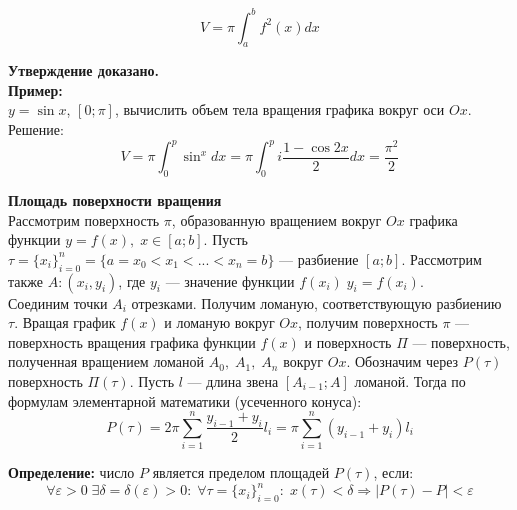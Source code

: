 \documentclass{article}
\begin{document}
  \begin{equation}
    V=\pi\int_a^b f^2(x)dx
  \end{equation}
  
  \textbf{Утверждение доказано.}\\
  
  \textbf{Пример:}\\
  
  $y=\sin x$, $[0;\pi]$, вычислить объем тела вращения графика вокруг оси $Ox$. Решение:\\
  
  \begin{equation}
    V=\pi\int_0^p\sin^x dx=\pi\int_0^pi\frac{1-\cos 2x}{2}dx=\frac{\pi^2}{2}
  \end{equation}
  
  \large\textbf{Площадь поверхности вращения}\normalsize\\
  
  Рассмотрим поверхность $\pi$, образованную вращением вокруг $Ox$ графика функции $y=f(x),\;x\in[a;b]$. Пусть $\tau=\{x_i\}_{i=0}^n=\{a=x_0<x_1<...<x_n=b\}$ --- разбиение $[a;b]$. Рассмотрим также $A:(x_i,y_i)$, где $y_i$ --- значение функции $f(x_i)\;y_i=f(x_i)$.\\
  
  Соединим точки $A_i$ отрезками. Получим ломаную, соответствующую разбиению $\tau$. Вращая график $f(x)$ и ломаную вокруг $Ox$, получим поверхность $\pi$ --- поверхность вращения графика функции $f(x)$ и поверхность $\Pi$ --- поверхность, полученная вращением ломаной $A_0,\;A_1,\;A_n$ вокруг $Ox$. Обозначим через $P(\tau)$ поверхность $\Pi(\tau)$. Пусть $l$ --- длина звена $[A_{i-1};A]$ ломаной. Тогда по формулам элементарной математики (усеченного конуса):\\
  \begin{equation}
    P(\tau)=2\pi\sum_{i=1}^n\frac{y_{i-1}+y_i}{2}l_i=\pi\sum_{i=1}^n(y_{i-1}+y_i)l_i
  \end{equation}
  
  \textbf{Определение:} число $P$ является пределом площадей $P(\tau)$, если:
  \begin{equation}
    \forall\varepsilon>0\;\exists\delta=\delta(\varepsilon)>0:\;\forall\tau=\{x_i\}_{i=0}^n:\;x(\tau)<\delta\Rightarrow |P(\tau)-P|<\varepsilon
  \end{equation}
  
  
\end{document}
